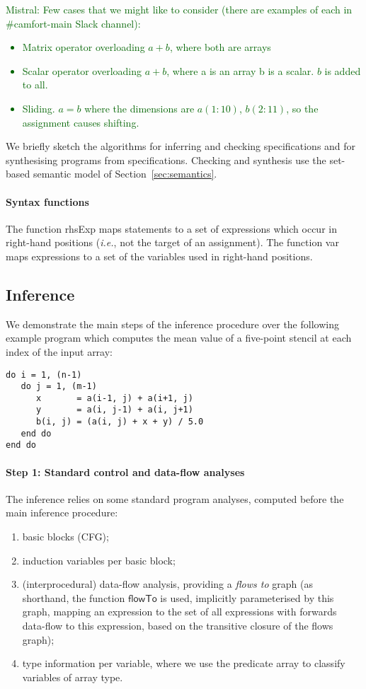 \documentclass[9pt]{sigplanconf}
\newcommand{\mnote}[1]{\textcolor{darkgreen}{Mistral: #1}}
\newcounter{block}
\theoremstyle{definition}
\newcommand{\ie}{\emph{i.e.}}
\newcommand{\arrayTy}{\textsf{array}}
\newcommand{\rhsExp}{\textsf{rhsExp}}
\newcommand{\var}{\textsf{var}}
\begin{document}
\mnote{Few cases that we might like to consider (there are examples
    of each in \#camfort-main Slack channel):
  \begin{itemize}
    \item Matrix operator overloading $a + b$, where both are arrays
    \item Scalar operator overloading $a + b$, where a is an array b is a
      scalar. $b$ is added to all.
    \item Sliding. $a = b$ where the dimensions are $a(1:10)$, $b(2:11)$,
      so the assignment causes shifting.
  \end{itemize}
}

\noindent
We briefly sketch the algorithms for inferring and checking
specifications and for synthesising programs from specifications.
Checking and synthesis use the set-based semantic model of
Section~\ref{sec:semantics}.

\paragraph{Syntax functions}
The function \rhsExp{} maps statements to a
set of expressions which occur in right-hand positions (\ie{}, not the
target of an assignment). The function \var{} maps expressions to a
set of the variables used in right-hand positions.

\subsection{Inference\label{sec:inference}}

We demonstrate the main steps of the inference procedure over the
following example program which computes the mean value
of a five-point stencil at each index of the input array:
\begin{verbatim}
do i = 1, (n-1)
   do j = 1, (m-1)
      x       = a(i-1, j) + a(i+1, j)
      y       = a(i, j-1) + a(i, j+1)
      b(i, j) = (a(i, j) + x + y) / 5.0
   end do
end do
\end{verbatim}
\paragraph{Step 1: Standard control and data-flow analyses}
The inference relies on some standard program analyses, computed
before the main inference procedure:
%
\begin{enumerate}
\item basic blocks (CFG);
\item induction variables per basic block;
\item (interprocedural) data-flow analysis, providing a \emph{flows to}
  graph (as shorthand, the function
  $\mathsf{flowTo}$ is used, implicitly parameterised by this graph,
  mapping an expression to the set of all expressions
  with forwards data-flow to this expression, based on the transitive
  closure of the flows graph);
\item type information per variable, where we use the predicate
\arrayTy{} to classify variables of array type.
\end{enumerate}
%
\end{document}
